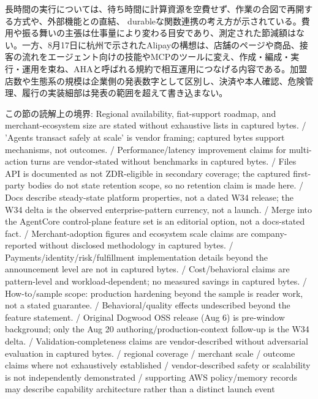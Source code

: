 \noindent 長時間の実行については、待ち時間に計算資源を空費せず、作業の合図で再開する方式や、外部機能との直結、 durableな関数連携の考え方が示されている。費用や振る舞いの主張は仕事量により変わる目安であり、測定された節減額はない。一方、8月17日に杭州で示されたAlipayの構想は、店舗のページや商品、接客の流れをエージェント向けの技能やMCPのツールに変え、作成・編成・実行・運用を束ね、AHAと呼ばれる規約で相互運用につなげる内容である。加盟店数や生態系の規模は企業側の発表数字として区別し、決済や本人確認、危険管理、履行の実装細部は発表の範囲を超えて書き込まない。 \cite{w2026w34w34eventc105,w2026w34w34eventc007}\par\medskip

\begin{claimboundary}[読解上の境界]
この節の読解上の境界: Regional availability, fiat-support roadmap, and merchant-ecosystem size are stated without exhaustive lists in captured bytes. / 'Agents transact safely at scale' is vendor framing; captured bytes support mechanisms, not outcomes. / Performance/latency improvement claims for multi-action turns are vendor-stated without benchmarks in captured bytes. / Files API is documented as not ZDR-eligible in secondary coverage; the captured first-party bodies do not state retention scope, so no retention claim is made here. / Docs describe steady-state platform properties, not a dated W34 release; the W34 delta is the observed enterprise-pattern currency, not a launch. / Merge into the AgentCore control-plane feature set is an editorial option, not a docs-stated fact. / Merchant-adoption figures and ecosystem scale claims are company-reported without disclosed methodology in captured bytes. / Payments/identity/risk/fulfillment implementation details beyond the announcement level are not in captured bytes. / Cost/behavioral claims are pattern-level and workload-dependent; no measured savings in captured bytes. / How-to/sample scope: production hardening beyond the sample is reader work, not a stated guarantee. / Behavioral/quality effects undescribed beyond the feature statement. / Original Dogwood OSS release (Aug 6) is pre-window background; only the Aug 20 authoring/production-context follow-up is the W34 delta. / Validation-completeness claims are vendor-described without adversarial evaluation in captured bytes. / regional coverage / merchant scale / outcome claims where not exhaustively established / vendor-described safety or scalability is not independently demonstrated / supporting AWS policy/memory records may describe capability architecture rather than a distinct launch event
\end{claimboundary}
